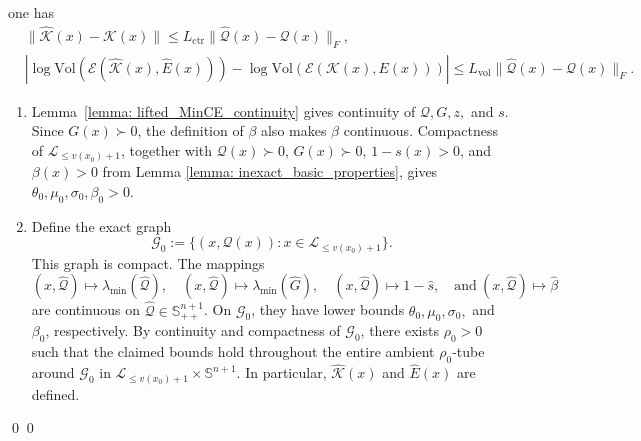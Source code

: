 \documentclass[smallextended]{svjour3}
\let\springerproof\proof
\let\endspringerproof\endproof
\renewenvironment{proof}{\springerproof}{%
  \ifhmode\qed\else\leavevmode\qed\fi\endspringerproof}
\newcommand{\V}{{\mathrm{Vol}}}
\newcommand{\K}{\mathcal{K}}
\newcommand{\E}{\mathcal{E}}
\renewcommand{\S}{\mathbb{S}}
\begin{document}
\begin{lemma}
\begin{enumerate}
        one has
        \begin{align}
            & \|\widehat{\K}(x)-\K(x)\|
            \leq
            L_{\mathrm{ctr}}\|\widehat{\mathcal{Q}}(x)-\mathcal{Q}(x)\|_F,  \label{eq: inexact_lipschitz_constants_center}  \\
            & \left|
                \log\V(\E(\widehat{\K}(x),\widehat{E}(x)))
                -
                \log\V(\E(\K(x),E(x)))
            \right|
            \leq
            L_{\mathrm{vol}}\|\widehat{\mathcal{Q}}(x)-\mathcal{Q}(x)\|_F. \label{eq: inexact_lipschitz_constants_vol}
        \end{align}
    \end{enumerate}
\end{lemma}
\begin{proof}
    \begin{enumerate}
        \item Lemma~\ref{lemma: lifted_MinCE_continuity} gives continuity of
        $\mathcal{Q},G,z,$ and $s$. Since $G(x)\succ0$, the definition of
        $\beta$ also makes $\beta$ continuous. Compactness of
        $\mathcal{L}_{\leq v(x_0)+1}$, together with
        $\mathcal Q(x)\succ0$, $G(x)\succ0$,
        $1-s(x)>0$, and $\beta(x)>0$ from Lemma
        \ref{lemma: inexact_basic_properties}, gives
        $\theta_0,\mu_0,\sigma_0,\beta_0>0$.

        \item Define the exact graph
        \[
            \mathcal{G}_0:=\{(x,\mathcal{Q}(x)):x\in \mathcal{L}_{\leq v(x_0)+1} \}.
        \]
        This graph is compact.
        The mappings
        \[
            (x,\widehat{\mathcal{Q}})\mapsto \lambda_{\min}(\widehat{\mathcal Q}),\quad
            (x,\widehat{\mathcal{Q}})\mapsto \lambda_{\min}(\widehat{G}),\quad
            (x,\widehat{\mathcal{Q}})\mapsto 1-\widehat{s},\quad \text{and}~
            (x,\widehat{\mathcal{Q}})\mapsto \widehat{\beta}
        \]
        are continuous on $\widehat{\mathcal{Q}}\in\S^{n+1}_{++}$. On
        $\mathcal{G}_0$, they have lower bounds
        $\theta_0,\mu_0,\sigma_0,$ and $\beta_0$, respectively.
        By continuity and compactness of $\mathcal G_0$, there exists
        $\rho_0>0$ such that the claimed bounds hold throughout the entire
        ambient $\rho_0$-tube around $\mathcal G_0$ in
        $\mathcal L_{\leq v(x_0)+1}\times\S^{n+1}$. In particular,
        $\widehat{\K}(x)$ and $\widehat{E}(x)$ are defined.


\end{enumerate}
\end{proof}
\end{document}
